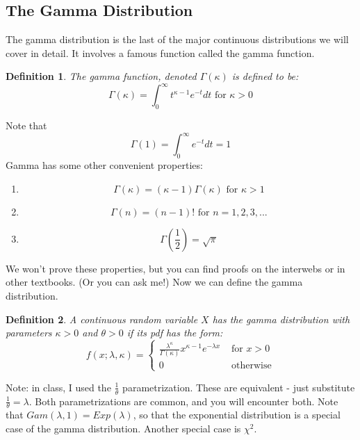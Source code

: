 \documentclass[12pt]{article} %
\newtheorem{defn}{Definition}
\begin{document}
\subsection{The Gamma Distribution}
The gamma distribution is the last of the major continuous distributions we will cover in detail. It involves a famous function called the gamma function.
\begin{defn}
The gamma function, denoted $\Gamma(\kappa)$ is defined to be:
$$\Gamma(\kappa) = \int_0^{\infty} t^{\kappa -1} e^{-t} dt \textrm{ for } \kappa >0$$
\end{defn}
Note that 
$$\Gamma(1)= \int_0^\infty e^{-t} dt = 1$$
Gamma has some other convenient properties:
\begin{enumerate}
\item $$\Gamma(\kappa) = (\kappa-1)\Gamma(\kappa) \textrm{ for } \kappa >1$$
\item $$\Gamma(n) = (n-1)! \textrm{ for } n=1,2,3,...$$
\item $$\Gamma(\frac12) = \sqrt{\pi}$$
\end{enumerate}
We won't prove these properties, but you can find proofs on the interwebs or in other textbooks. (Or you can ask me!) Now we can define the gamma distribution.
\begin{defn}
A continuous random variable $X$ has the gamma distribution with parameters $\kappa>0$ and $\theta>0$ if its pdf has the form:
$$f(x;\lambda,\kappa) = \left\{\begin{matrix}
\frac{\lambda^\kappa}{\Gamma(\kappa)}x^{\kappa-1} e^{-\lambda x} & \textrm{ for } x>0\\0&\textrm{ otherwise}\end{matrix}\right.$$
\end{defn}
Note: in class, I used the $\frac1\theta$ parametrization. These are equivalent - just substitute $\frac1\theta = \lambda$. Both parametrizations are common, and you will encounter both.
Note that $Gam(\lambda, 1) = Exp(\lambda)$, so that the exponential distribution is a special case of the gamma distribution. Another special case is $\chi^2$.
\end{document}
